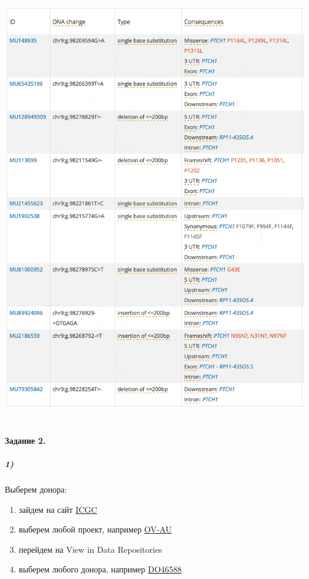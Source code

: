 \documentclass[12pt]{article}
\begin{document}
\includegraphics[width=\textwidth]{images/image6.png}\\\\

\paragraph{Задание 2.\\}
\subparagraph{1)}
Выберем донора:
\begin{enumerate}
\setlength{\itemsep}{0pt}
    \item зайдем на сайт \href{https://dcc.icgc.org/genes/ENSG00000185920/mutations?mutations}{ICGC}
    \item выберем любой проект, например \href{https://dcc.icgc.org/projects/OV-AU}{OV-AU}
    \item перейдем на View in Data Repositories
    \item выберем любого донора, например \href{https://dcc.icgc.org/donors/DO46588}{DO46588}
\end{enumerate}
\end{document}
